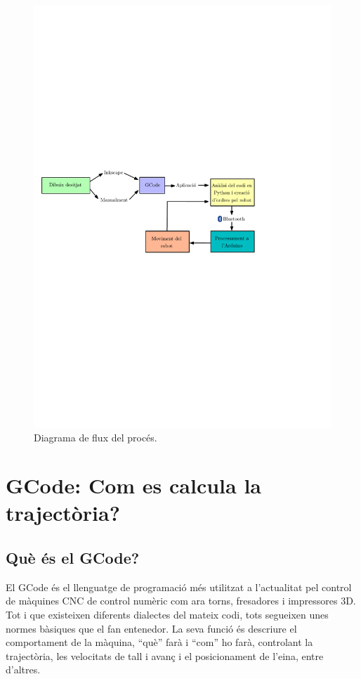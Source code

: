 \begin{figure}[H]
	\centering
	\includegraphics{figuretry}
	\caption{Diagrama de flux del procés.}
	\label{fig:diagflux}
\end{figure}




\section{GCode: Com es calcula la trajectòria?}

\subsection{Què és el GCode?}
El GCode és el llenguatge de programació més utilitzat a l'actualitat pel control de màquines CNC de control numèric com ara torns, fresadores i impressores 3D. Tot i que existeixen diferents dialectes del mateix codi, tots segueixen unes normes bàsiques que el fan entenedor. La seva funció és descriure el comportament de la màquina, “què” farà i “com” ho farà, controlant la trajectòria, les velocitats de tall i avanç i el posicionament de l'eina, entre d'altres.

